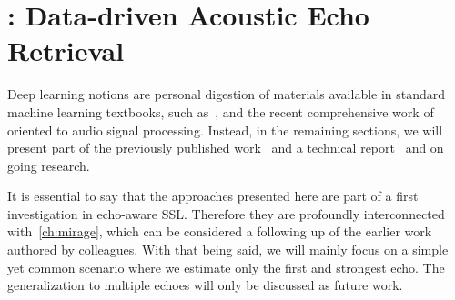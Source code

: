 \chapter{: Data-driven Acoustic Echo Retrieval}\label{ch:lantern}

 \synopsisChLantern

\mynewline
Deep learning notions are personal digestion of materials available in standard machine learning textbooks, such as~, and the recent comprehensive work of~ oriented to audio signal processing.
Instead, in the remaining sections, we will present part of the previously published work~\cite{di2019mirage} and a technical report~\cite{di2019honda} and on going research.

\mynewline
It is essential to say that the approaches presented here are part of a first investigation in echo-aware \ac{SSL}.
Therefore they are profoundly interconnected with~\cref{ch:mirage}, which can be considered a following up of the earlier work~ authored by colleagues.
With that being said, we will mainly focus on a simple yet common scenario where we estimate only the first and strongest echo.
The generalization to multiple echoes will only be discussed as future work.


